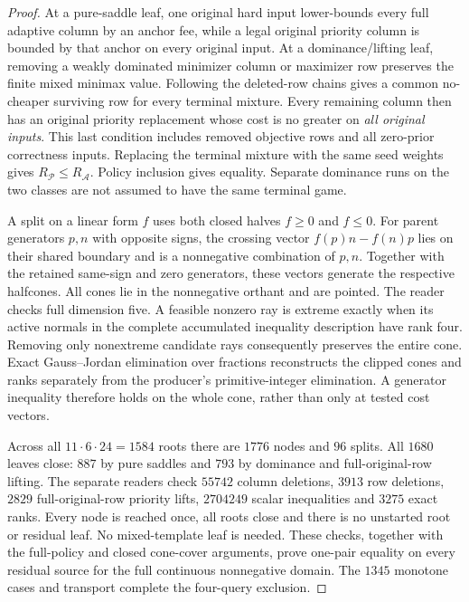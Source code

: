 \begin{proof}
At a pure-saddle leaf, one original hard input lower-bounds every
full adaptive column by an anchor fee, while a legal original
priority column is bounded by that anchor on every original input.
At a dominance/lifting leaf, removing a weakly dominated minimizer
column or maximizer row preserves the finite mixed minimax value.
Following the deleted-row chains gives a common no-cheaper surviving
row for every terminal mixture. Every remaining column then has an
original priority replacement whose cost is no greater on
\emph{all original inputs}. This last condition includes removed
objective rows and all zero-prior correctness inputs. Replacing the
terminal mixture with the same seed weights gives
$R_{\mathcal P}\leq R_{\mathcal A}$. Policy inclusion gives equality.
Separate dominance runs on the two classes are not assumed to have
the same terminal game.

A split on a linear form $f$ uses both closed halves $f\geq0$ and
$f\leq0$. For parent generators $p,n$ with opposite signs, the
crossing vector $f(p)n-f(n)p$ lies on their shared boundary and is a
nonnegative combination of $p,n$. Together with the retained
same-sign and zero generators, these vectors generate the respective
halfcones. All cones lie in the nonnegative orthant and are pointed.
The reader checks full dimension five. A feasible nonzero ray is
extreme exactly when its active normals in the complete accumulated
inequality description have rank four. Removing only nonextreme
candidate rays consequently preserves the entire cone. Exact
Gauss--Jordan elimination over fractions reconstructs the clipped
cones and ranks separately from the producer's primitive-integer
elimination. A generator inequality therefore holds on the whole
cone, rather than only at tested cost vectors.

Across all $11\cdot6\cdot24=1584$ roots there are $1776$ nodes and
$96$ splits. All $1680$ leaves close: $887$ by pure saddles and
$793$ by dominance and full-original-row lifting. The separate readers
check $55742$ column deletions, $3913$ row deletions, $2829$
full-original-row priority lifts, $2704249$ scalar inequalities and
$3275$ exact ranks. Every node is reached once, all roots close and
there is no unstarted root or residual leaf. No mixed-template leaf
is needed. These checks, together with the full-policy and closed
cone-cover arguments, prove one-pair equality on every residual
source for the full continuous nonnegative domain. The $1345$
monotone cases and transport complete the four-query exclusion.


\end{proof}
